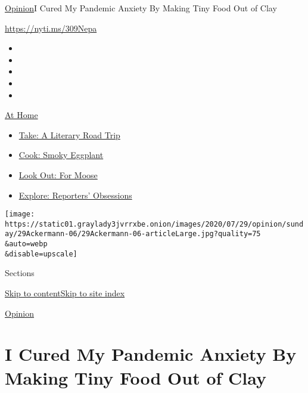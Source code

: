 \href{/section/opinion}{Opinion}\textbar{}I Cured My Pandemic Anxiety By
Making Tiny Food Out of Clay

\url{https://nyti.ms/309Nepa}

\begin{itemize}
\item
\item
\item
\item
\item
\end{itemize}

\href{https://www.nytimes3xbfgragh.onion/spotlight/at-home?action=click\&pgtype=Article\&state=default\&region=TOP_BANNER\&context=at_home_menu}{At
Home}

\begin{itemize}
\tightlist
\item
  \href{https://www.nytimes3xbfgragh.onion/2020/07/28/books/time-for-a-literary-road-trip.html?action=click\&pgtype=Article\&state=default\&region=TOP_BANNER\&context=at_home_menu}{Take:
  A Literary Road Trip}
\item
  \href{https://www.nytimes3xbfgragh.onion/2020/07/29/magazine/bored-with-your-home-cooking-some-smoky-eggplant-will-fix-that.html?action=click\&pgtype=Article\&state=default\&region=TOP_BANNER\&context=at_home_menu}{Cook:
  Smoky Eggplant}
\item
  \href{https://www.nytimes3xbfgragh.onion/2020/07/27/travel/moose-michigan-isle-royale.html?action=click\&pgtype=Article\&state=default\&region=TOP_BANNER\&context=at_home_menu}{Look
  Out: For Moose}
\item
  \href{https://www.nytimes3xbfgragh.onion/interactive/2020/at-home/even-more-reporters-editors-diaries-lists-recommendations.html?action=click\&pgtype=Article\&state=default\&region=TOP_BANNER\&context=at_home_menu}{Explore:
  Reporters' Obsessions}
\end{itemize}

\texttt{[image: https://static01.graylady3jvrrxbe.onion/images/2020/07/29/opinion/sunday/29Ackermann-06/29Ackermann-06-articleLarge.jpg?quality=75\\\&auto=webp\\\&disable=upscale]}

Sections

\protect\hyperlink{site-content}{Skip to
content}\protect\hyperlink{site-index}{Skip to site index}

\href{/section/opinion}{Opinion}

\hypertarget{i-cured-my-pandemic-anxiety-by-making-tiny-food-out-of-clay}{%
\section{I Cured My Pandemic Anxiety By Making Tiny Food Out of
Clay}\label{i-cured-my-pandemic-anxiety-by-making-tiny-food-out-of-clay}}

